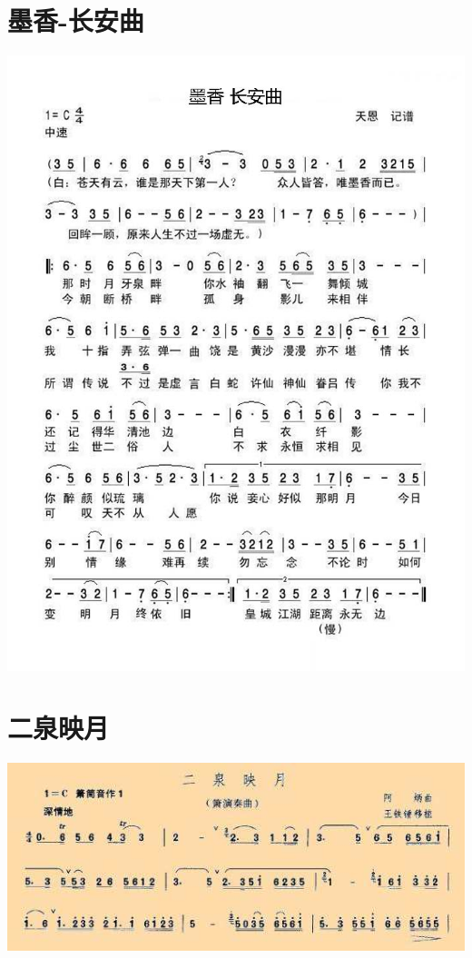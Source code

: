 \documentclass[cn,pad,chinese,chinesefont=nofont]{elegantbook}
\begin{document}
\section{墨香-长安曲}
    \includegraphics[width=\textwidth]{dongxiao/20200323墨香-长安曲.jpg}

\section{二泉映月}
    \includegraphics[width=\textwidth]{dongxiao/20200324二泉映月.jpg}  
\end{document}
